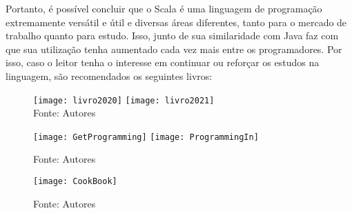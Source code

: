 	Portanto, é possível concluir que o Scala é uma linguagem de programação extremamente versátil e útil e diversas áreas diferentes, tanto para o mercado de trabalho quanto para estudo. Isso, junto de sua similaridade com Java faz com que sua utilização tenha aumentado cada vez mais entre os programadores. Por isso, caso o leitor tenha o interesse em continuar ou reforçar os estudos na linguagem, são recomendados os seguintes livros:
	

   \begin{figure}[H]
    \begin{center}
        \caption{} \label{ling2}
        \texttt{[image: livro2020]}
        \texttt{[image: livro2021]} \\
        {\tiny \sf Fonte: Autores }
    \end{center}
   \end{figure} 

	
	\begin{figure}[H]
		\centering
		\texttt{[image: GetProgramming]}
		\texttt{[image: ProgrammingIn]}
		\caption{}
		\label{fig:programming}
		Fonte: Autores
	\end{figure}

	\begin{figure}[H]
		\centering
		\texttt{[image: CookBook]}
		\caption{}
		\label{fig:programming}
		Fonte: Autores
	\end{figure}

	